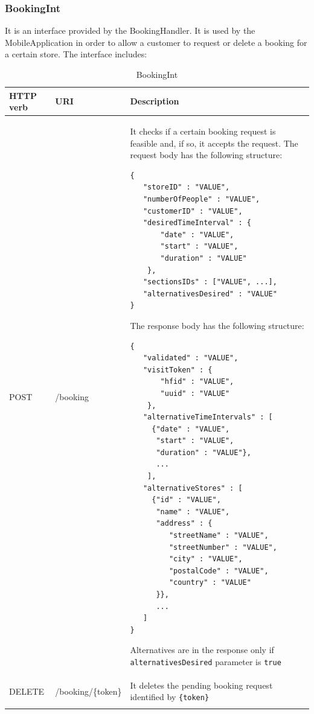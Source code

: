 \documentclass[a4paper,oneside,11pt]{book}
\begin{document}
    \subsubsection{BookingInt}
    It is an interface provided by the BookingHandler. It is used by the MobileApplication in order to allow a customer to request or delete a booking for a certain store. The interface includes:
    \begin{longtable}[c] { |>{\centering\arraybackslash}H{0.11\textwidth}|>{\centering\arraybackslash\ttfamily}P{0.23\textwidth}|H{0.50\textwidth}| }
        \hline
        \textbf{HTTP verb} & \textrm{\textbf{URI}} & \textbf{\textbf{Description}} \\ \hline
        POST & /booking & It checks if a certain booking request is feasible and, if so, it accepts the request. The request body has the following structure:
        \begin{lstlisting}[language=jsonDD]
{
   "storeID" : "VALUE",
   "numberOfPeople" : "VALUE",
   "customerID" : "VALUE",
   "desiredTimeInterval" : {
       "date" : "VALUE",
       "start" : "VALUE",
       "duration" : "VALUE"
    },
   "sectionsIDs" : ["VALUE", ...],
   "alternativesDesired" : "VALUE"
}
        \end{lstlisting}
        The response body has the following structure:
        \begin{lstlisting}[language=jsonDD]
{
   "validated" : "VALUE",
   "visitToken" : {
       "hfid" : "VALUE",
       "uuid" : "VALUE"
    },
   "alternativeTimeIntervals" : [
     {"date" : "VALUE",
      "start" : "VALUE",
      "duration" : "VALUE"},
      ...
    ],
   "alternativeStores" : [
     {"id" : "VALUE",
      "name" : "VALUE",
      "address" : {
         "streetName" : "VALUE",
         "streetNumber" : "VALUE",
         "city" : "VALUE",
         "postalCode" : "VALUE",
         "country" : "VALUE"
      }},
      ...
   ]
}
        \end{lstlisting}
        Alternatives are in the response only if \texttt{alternativesDesired} parameter is \texttt{true}
        \\ \hline
        DELETE & /booking/\{token\} & It deletes the pending booking request identified by \texttt{\{token\}} \\ \hline
        \caption{BookingInt}
        \label{table:booking_int}
    \end{longtable}
    
\end{document}
